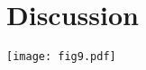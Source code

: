 \documentclass[pdflatex,referee,iicol,sn-basic]{sn-jnl}
\theoremstyle{thmstyleone}%
\theoremstyle{thmstyletwo}%
\theoremstyle{thmstylethree}%
\begin{document}
\section{Discussion}\label{sec-discussion}

\begin{figure*}%
    \centering
    \texttt{[image: fig9.pdf]}
    \caption{}
    \label{fig9}
\end{figure*}







\end{document}
